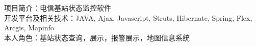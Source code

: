 \documentclass{res}
\begin{document}
\begin{CJK}{UTF8}{song}
\begin{resume}
\begin{itemize}
    项目简介：电信基站状态监控软件\\
    开发平台及相关技术：JAVA, Ajax, Javascript, Struts, Hibernate, Spring, Flex, Arcgis, Mapinfo\\
    本人角色：基站状态查询，展示，报警展示，地图信息系统\\
  \end{itemize}



\end{resume}
\end{CJK}
\end{document}
